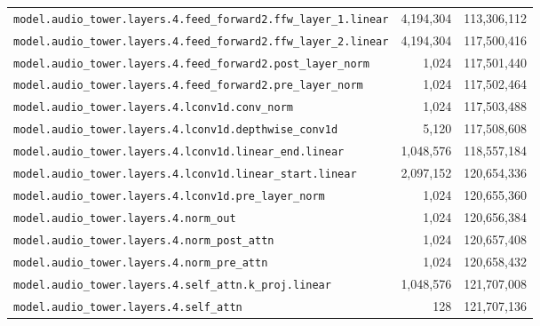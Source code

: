 \documentclass[10pt,a4paper]{article}
\theoremstyle{definition}
\begin{document}
\begin{appendices}
\begin{longtable}{p{9.5cm}rr}
\texttt{model.\allowbreak{}audio\_tower.\allowbreak{}layers.\allowbreak{}4.\allowbreak{}feed\_forward2.\allowbreak{}ffw\_layer\_1.\allowbreak{}linear} & 4,194,304 & 113,306,112 \\
\texttt{model.\allowbreak{}audio\_tower.\allowbreak{}layers.\allowbreak{}4.\allowbreak{}feed\_forward2.\allowbreak{}ffw\_layer\_2.\allowbreak{}linear} & 4,194,304 & 117,500,416 \\
\texttt{model.\allowbreak{}audio\_tower.\allowbreak{}layers.\allowbreak{}4.\allowbreak{}feed\_forward2.\allowbreak{}post\_layer\_norm} & 1,024 & 117,501,440 \\
\texttt{model.\allowbreak{}audio\_tower.\allowbreak{}layers.\allowbreak{}4.\allowbreak{}feed\_forward2.\allowbreak{}pre\_layer\_norm} & 1,024 & 117,502,464 \\
\texttt{model.\allowbreak{}audio\_tower.\allowbreak{}layers.\allowbreak{}4.\allowbreak{}lconv1d.\allowbreak{}conv\_norm} & 1,024 & 117,503,488 \\
\texttt{model.\allowbreak{}audio\_tower.\allowbreak{}layers.\allowbreak{}4.\allowbreak{}lconv1d.\allowbreak{}depthwise\_conv1d} & 5,120 & 117,508,608 \\
\texttt{model.\allowbreak{}audio\_tower.\allowbreak{}layers.\allowbreak{}4.\allowbreak{}lconv1d.\allowbreak{}linear\_end.\allowbreak{}linear} & 1,048,576 & 118,557,184 \\
\texttt{model.\allowbreak{}audio\_tower.\allowbreak{}layers.\allowbreak{}4.\allowbreak{}lconv1d.\allowbreak{}linear\_start.\allowbreak{}linear} & 2,097,152 & 120,654,336 \\
\texttt{model.\allowbreak{}audio\_tower.\allowbreak{}layers.\allowbreak{}4.\allowbreak{}lconv1d.\allowbreak{}pre\_layer\_norm} & 1,024 & 120,655,360 \\
\texttt{model.\allowbreak{}audio\_tower.\allowbreak{}layers.\allowbreak{}4.\allowbreak{}norm\_out} & 1,024 & 120,656,384 \\
\texttt{model.\allowbreak{}audio\_tower.\allowbreak{}layers.\allowbreak{}4.\allowbreak{}norm\_post\_attn} & 1,024 & 120,657,408 \\
\texttt{model.\allowbreak{}audio\_tower.\allowbreak{}layers.\allowbreak{}4.\allowbreak{}norm\_pre\_attn} & 1,024 & 120,658,432 \\
\texttt{model.\allowbreak{}audio\_tower.\allowbreak{}layers.\allowbreak{}4.\allowbreak{}self\_attn.\allowbreak{}k\_proj.\allowbreak{}linear} & 1,048,576 & 121,707,008 \\
\texttt{model.\allowbreak{}audio\_tower.\allowbreak{}layers.\allowbreak{}4.\allowbreak{}self\_attn} & 128 & 121,707,136 \\

\end{longtable}
\end{appendices}
\end{document}
